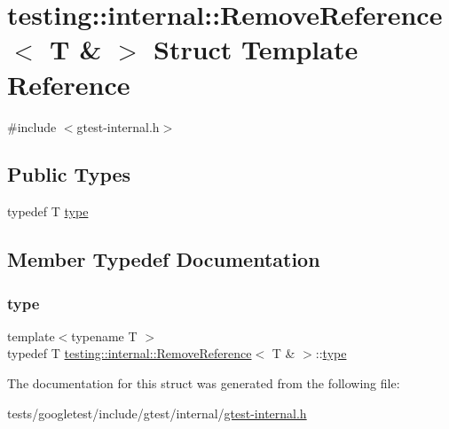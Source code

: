 \hypertarget{structtesting_1_1internal_1_1RemoveReference_3_01T_01_6_01_4}{}\section{testing\+:\+:internal\+:\+:Remove\+Reference$<$ T \& $>$ Struct Template Reference}
\label{structtesting_1_1internal_1_1RemoveReference_3_01T_01_6_01_4}


{\ttfamily \#include $<$gtest-\/internal.\+h$>$}

\subsection*{Public Types}
\begin{DoxyCompactItemize}
\item 
typedef T \hyperlink{structtesting_1_1internal_1_1RemoveReference_3_01T_01_6_01_4_a3d0f32a66759f333c2dd66aa31005e6d}{type}
\end{DoxyCompactItemize}


\subsection{Member Typedef Documentation}
\mbox{\label{structtesting_1_1internal_1_1RemoveReference_3_01T_01_6_01_4_a3d0f32a66759f333c2dd66aa31005e6d}} 
\subsubsection{\texorpdfstring{type}{type}}
{\footnotesize\ttfamily template$<$typename T $>$ \\
typedef T \hyperlink{structtesting_1_1internal_1_1RemoveReference}{testing\+::internal\+::\+Remove\+Reference}$<$ T \& $>$\+::\hyperlink{structtesting_1_1internal_1_1RemoveReference_3_01T_01_6_01_4_a3d0f32a66759f333c2dd66aa31005e6d}{type}}



The documentation for this struct was generated from the following file\+:\begin{DoxyCompactItemize}
\item 
tests/googletest/include/gtest/internal/\hyperlink{gtest-internal_8h}{gtest-\/internal.\+h}\end{DoxyCompactItemize}
